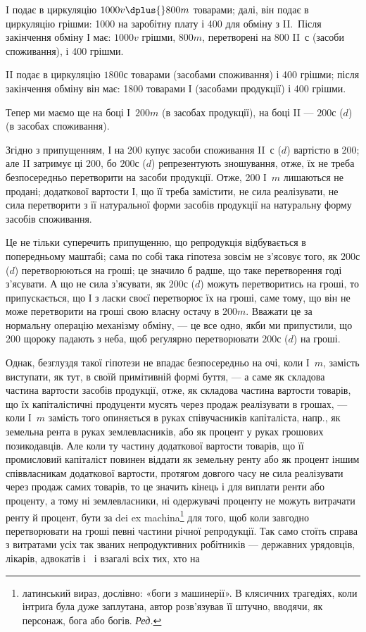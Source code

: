 
I подає в циркуляцію $1000 v \dplus{} 800 m$ товарами; далі, він подає
в циркуляцію грішми: 1000 на заробітну плату і 400
для обміну з II.~Після закінчення обміну І має: $1000 v$ грішми, $800 m$,
перетворені на 800 II~$с$ (засоби споживання), і 400 грішми.

II подає в циркуляцію $1800 с$ товарами (засобами споживання) і
400 грішми; після закінчення обміну він має: 1800 товарами І
(засобами продукції) і 400 грішми.

Тепер ми маємо ще на боці І~$200 m$ (в засобах продукції), на боці
II — $200 с$ ($d$) (в засобах споживання).

Згідно з припущенням, І на 200 купує засоби споживання
II~$с$ ($d$) вартістю в 200; але II затримує ці 200, бо $200 с$ ($d$)
репрезентують зношування, отже, їх не треба безпосередньо перетворити
на засоби продукції. Отже, 200 І~$m$ лишаються не продані;
 додаткової вартости І, що її треба замістити, не сила реалізувати, не
сила перетворити з її натуральної форми засобів продукції на натуральну
форму засобів споживання.

Це не тільки суперечить припущенню, що репродукція відбувається
в попередньому маштабі; сама по собі така гіпотеза зовсім не з’ясовує
того, як $200 с$ ($d$) перетворюються на гроші; це значило б радше, що
таке перетворення годі з’ясувати. А що не сила з’ясувати, як $200 с$ ($d$)
можуть перетворитись на гроші, то припускається, що І з ласки своєї
перетворює їх на гроші, саме тому, що він не може перетворити на гроші
свою власну остачу в $200 m$. Вважати це за нормальну операцію механізму
обміну, — це все одно, якби ми припустили, що 200
щороку падають з неба, щоб реґулярно перетворювати $200 с$ ($d$) на гроші.

Однак, безглуздя такої гіпотези не впадає безпосередньо на очі, коли І~$m$,
замість виступати, як тут, в своїй примітивній формі буття, — а саме як
складова частина вартости засобів продукції, отже, як складова частина
вартости товарів, що їх капіталістичні продуценти мусять через продаж
реалізувати в грошах, — коли І~$m$ замість того опиняється в руках співучасників
капіталіста, напр., як земельна рента в руках землевласників,
або як процент у руках грошових позикодавців. Але коли ту частину додаткової
вартости товарів, що її промисловий капіталіст повинен віддати
як земельну ренту або як процент іншим співвласникам додаткової вартости,
протягом довгого часу не сила реалізувати через продаж самих
товарів, то це значить кінець і для виплати ренти або проценту, а тому
ні землевласники, ні одержувачі проценту не можуть витрачати ренту й
процент, бути за dei ex machina\footnote*{
латинський вираз, дослівно: «боги з машинерії». В клясичних
трагедіях, коли інтриґа була дуже заплутана, автор розв’язував її штучно,
вводячи, як персонаж, бога або богів. \emph{Ред.}
} для того, щоб коли завгодно перетворювати
на гроші певні частини річної репродукції. Так само стоїть
справа з витратами усіх так званих непродуктивних робітників — державних
урядовців, лікарів, адвокатів і~ і взагалі всіх тих, хто на
\parbreak{}  %
